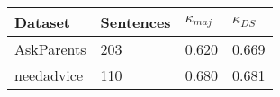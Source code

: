 \begin{tabular}{llll}
	\toprule
    \textbf{Dataset} & \textbf{Sentences} & $\kappa_{maj}$ & $\kappa_{DS}$  \\
    \midrule
    AskParents & 203 & 0.620 & 0.669 \\
    \midrule
    needadvice & 110 & 0.680 & 0.681 \\
    \bottomrule
\end{tabular}
